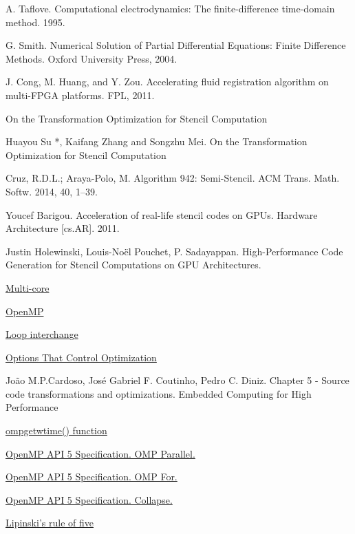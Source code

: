 \documentclass[conference]{IEEEtran}
\begin{document}
\begin{thebibliography}{1}

A. Taflove. Computational electrodynamics: The finite-difference time-domain method. 1995.

G. Smith. Numerical Solution of Partial Differential Equations: Finite Difference Methods. Oxford University Press, 2004.

J. Cong, M. Huang, and Y. Zou. Accelerating fluid registration algorithm on multi-FPGA platforms. FPL, 2011.

On the Transformation Optimization for Stencil Computation

Huayou Su *, Kaifang Zhang and Songzhu Mei. On the Transformation Optimization for Stencil Computation

Cruz, R.D.L.; Araya-Polo, M. Algorithm 942: Semi-Stencil. ACM Trans. Math. Softw. 2014, 40, 1–39.

Youcef Barigou. Acceleration of real-life stencil codes on GPUs. Hardware Architecture [cs.AR]. 2011.

Justin Holewinski, Louis-Noël Pouchet, P. Sadayappan. High-Performance Code Generation for Stencil Computations on GPU Architectures.

\href{https://www.techopedia.com/definition/5305/multicore}{Multi-core}

\href{https://www.openmp.org/}{OpenMP}

\href{https://en.wikipedia.org/wiki/Loop_interchange}{Loop interchange}

\href{https://gcc.gnu.org/onlinedocs/gcc/Optimize-Options.html}{Options That Control Optimization}
 
João M.P.Cardoso, José Gabriel F. Coutinho, Pedro C. Diniz. Chapter 5 - Source code transformations and optimizations. Embedded Computing for High Performance

\href{https://www.openmp.org/spec-html/5.0/openmpsu160.html}{omp\textunderscore get\textunderscore wtime() function}

\href{https://www.openmp.org/specifications/}{OpenMP API 5 Specification. OMP Parallel.}

\href{https://www.openmp.org/specifications/}{OpenMP API 5 Specification. OMP For.}

\href{https://www.openmp.org/specifications/}{OpenMP API 5 Specification. Collapse.}

\href{https://en.wikipedia.org/wiki/Lipinski\%27s_rule_of_five}{Lipinski's rule of five}

\end{thebibliography}
\end{document}
